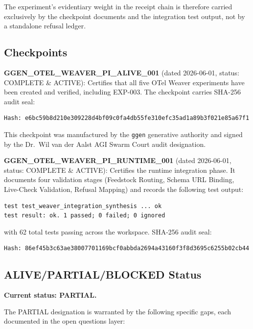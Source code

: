 The experiment's evidentiary weight in the receipt chain is therefore carried
exclusively by the checkpoint documents and the integration test output, not by a
standalone refusal ledger.

\subsection{Checkpoints}
\label{sec:otel-weaver-exp-003-live-check-to-refusal-evidence-checkpoints}

\textbf{GGEN\_OTEL\_WEAVER\_PI\_ALIVE\_001} (dated 2026-06-01, status: COMPLETE
\& ACTIVE): Certifies that all five OTel Weaver experiments have been created and
verified, including EXP-003. The checkpoint carries SHA-256 audit seal:
\begin{verbatim}
Hash: e6bc59b8d210e309228d4bf09c0fa4db55fe310efc35ad1a89b3f021e85a67f1
\end{verbatim}
This checkpoint was manufactured by the \texttt{ggen} generative authority and
signed by the Dr.\ Wil van der Aalst AGI Swarm Court audit designation.

\textbf{GGEN\_OTEL\_WEAVER\_PI\_RUNTIME\_001} (dated 2026-06-01, status: COMPLETE
\& ACTIVE): Certifies the runtime integration phase. It documents four validation
stages (Feedstock Routing, Schema URL Binding, Live-Check Validation, Refusal Mapping)
and records the following test output:
\begin{verbatim}
test test_weaver_integration_synthesis ... ok
test result: ok. 1 passed; 0 failed; 0 ignored
\end{verbatim}
with 62 total tests passing across the workspace. SHA-256 audit seal:
\begin{verbatim}
Hash: 86ef45b3c63ae38007701169bcf0abbda2694a43160f3f8d3695c6255b02cb44
\end{verbatim}

\subsection{ALIVE/PARTIAL/BLOCKED Status}
\label{sec:otel-weaver-exp-003-live-check-to-refusal-evidence-status}

\textbf{Current status: PARTIAL.}

The PARTIAL designation is warranted by the following specific gaps, each documented
in the open questions layer:

